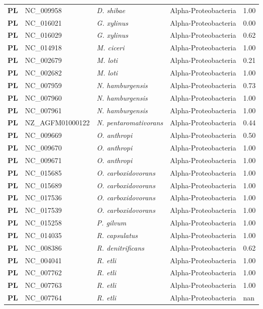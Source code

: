 \begin{adjustwidth}{-3cm}{2cm}
{\begin{supertabular}{>{\bfseries}l|p{0.1\textwidth}p{0.14\textwidth}l|l}
PL & NC\_009958 & \textit{D. shibae} & Alpha-Proteobacteria & 1.00\\
PL & NC\_016021 & \textit{G. xylinus} & Alpha-Proteobacteria & 0.00\\
PL & NC\_016029 & \textit{G. xylinus} & Alpha-Proteobacteria & 0.62\\
PL & NC\_014918 & \textit{M. ciceri} & Alpha-Proteobacteria & 1.00\\
PL & NC\_002679 & \textit{M. loti} & Alpha-Proteobacteria & 0.21\\
PL & NC\_002682 & \textit{M. loti} & Alpha-Proteobacteria & 1.00\\
PL & NC\_007959 & \textit{N. hamburgensis} & Alpha-Proteobacteria & 0.73\\
PL & NC\_007960 & \textit{N. hamburgensis} & Alpha-Proteobacteria & 1.00\\
PL & NC\_007961 & \textit{N. hamburgensis} & Alpha-Proteobacteria & 1.00\\
PL & NZ\_AGFM01000122 & \textit{N. pentaromativorans} & Alpha-Proteobacteria & 0.44\\
PL & NC\_009669 & \textit{O. anthropi} & Alpha-Proteobacteria & 0.50\\
PL & NC\_009670 & \textit{O. anthropi} & Alpha-Proteobacteria & 1.00\\
PL & NC\_009671 & \textit{O. anthropi} & Alpha-Proteobacteria & 1.00\\
PL & NC\_015685 & \textit{O. carboxidovorans} & Alpha-Proteobacteria & 1.00\\
PL & NC\_015689 & \textit{O. carboxidovorans} & Alpha-Proteobacteria & 1.00\\
PL & NC\_017536 & \textit{O. carboxidovorans} & Alpha-Proteobacteria & 1.00\\
PL & NC\_017539 & \textit{O. carboxidovorans} & Alpha-Proteobacteria & 1.00\\
PL & NC\_015258 & \textit{P. gilvum} & Alpha-Proteobacteria & 1.00\\
PL & NC\_014035 & \textit{R. capsulatus} & Alpha-Proteobacteria & 1.00\\
PL & NC\_008386 & \textit{R. denitrificans} & Alpha-Proteobacteria & 0.62\\
PL & NC\_004041 & \textit{R. etli} & Alpha-Proteobacteria & 1.00\\
PL & NC\_007762 & \textit{R. etli} & Alpha-Proteobacteria & 1.00\\
PL & NC\_007763 & \textit{R. etli} & Alpha-Proteobacteria & 1.00\\
PL & NC\_007764 & \textit{R. etli} & Alpha-Proteobacteria & nan\\

\end{supertabular}}
\end{adjustwidth}

